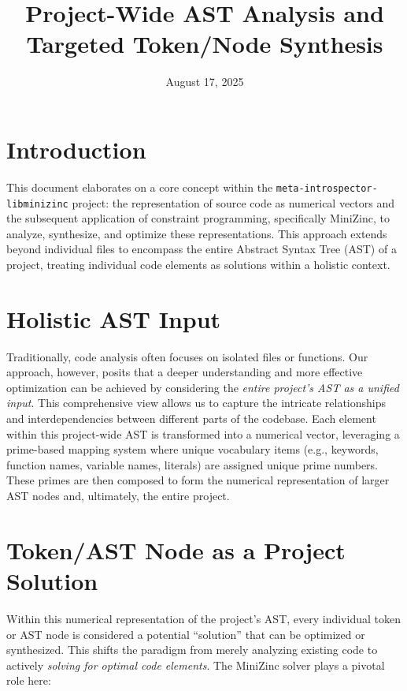 \documentclass{article}
\title{Project-Wide AST Analysis and Targeted Token/Node Synthesis}
\author{}
\date{August 17, 2025}
\begin{document}
\maketitle

\section{Introduction}

This document elaborates on a core concept within the \texttt{meta-introspector-libminizinc} project: the representation of source code as numerical vectors and the subsequent application of constraint programming, specifically MiniZinc, to analyze, synthesize, and optimize these representations. This approach extends beyond individual files to encompass the entire Abstract Syntax Tree (AST) of a project, treating individual code elements as solutions within a holistic context.

\section{Holistic AST Input}

Traditionally, code analysis often focuses on isolated files or functions. Our approach, however, posits that a deeper understanding and more effective optimization can be achieved by considering the \textit{entire project's AST as a unified input}. This comprehensive view allows us to capture the intricate relationships and interdependencies between different parts of the codebase. Each element within this project-wide AST is transformed into a numerical vector, leveraging a prime-based mapping system where unique vocabulary items (e.g., keywords, function names, variable names, literals) are assigned unique prime numbers. These primes are then composed to form the numerical representation of larger AST nodes and, ultimately, the entire project.

\section{Token/AST Node as a Project Solution}

Within this numerical representation of the project's AST, every individual token or AST node is considered a potential ``solution'' that can be optimized or synthesized. This shifts the paradigm from merely analyzing existing code to actively \textit{solving for optimal code elements}. The MiniZinc solver plays a pivotal role here:
\end{document}
